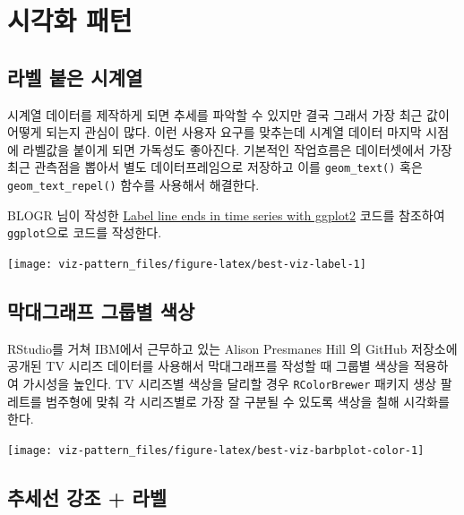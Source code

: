 \documentclass[
]{book}
\begin{document}
\hypertarget{ggplot-pattern}{%
\chapter{시각화 패턴}\label{ggplot-pattern}}

\hypertarget{gghighlight-timeseries}{%
\section{라벨 붙은 시계열}\label{gghighlight-timeseries}}

시계열 데이터를 제작하게 되면 추세를 파악할 수 있지만 결국 그래서 가장 최근 값이 어떻게 되는지 관심이 많다.
이런 사용자 요구를 맞추는데 시계열 데이터 마지막 시점에 라벨값을 붙이게 되면 가독성도 좋아진다.
기본적인 작업흐름은 데이터셋에서 가장 최근 관측점을 뽑아서 별도 데이터프레임으로 저장하고
이를 \texttt{geom\_text()} 혹은 \texttt{geom\_text\_repel()} 함수를 사용해서 해결한다.

BLOGR 님이 작성한 \href{https://drsimonj.svbtle.com/label-line-ends-in-time-series-with-ggplot2}{Label line ends in time series with ggplot2} 코드를 참조하여 \texttt{ggplot}으로 코드를 작성한다.

\begin{center}\texttt{[image: viz-pattern\_files/figure-latex/best-viz-label-1]} \end{center}

\hypertarget{gghighlight-barplot-color}{%
\section{막대그래프 그룹별 색상}\label{gghighlight-barplot-color}}

RStudio를 거쳐 IBM에서 근무하고 있는 Alison Presmanes Hill 의 GitHub 저장소에 공개된 TV 시리즈 데이터를 사용해서 막대그래프를 작성할 때 그룹별 색상을 적용하여 가시성을 높인다. TV 시리즈별 색상을 달리할 경우 \texttt{RColorBrewer} 패키지 생상 팔레트를 범주형에 맞춰 각 시리즈별로 가장 잘 구분될 수 있도록 색상을 칠해 시각화를 한다.

\begin{center}\texttt{[image: viz-pattern\_files/figure-latex/best-viz-barbplot-color-1]} \end{center}

\hypertarget{gghighlight-trend-line-label}{%
\section{추세선 강조 + 라벨}\label{gghighlight-trend-line-label}}
\end{document}
